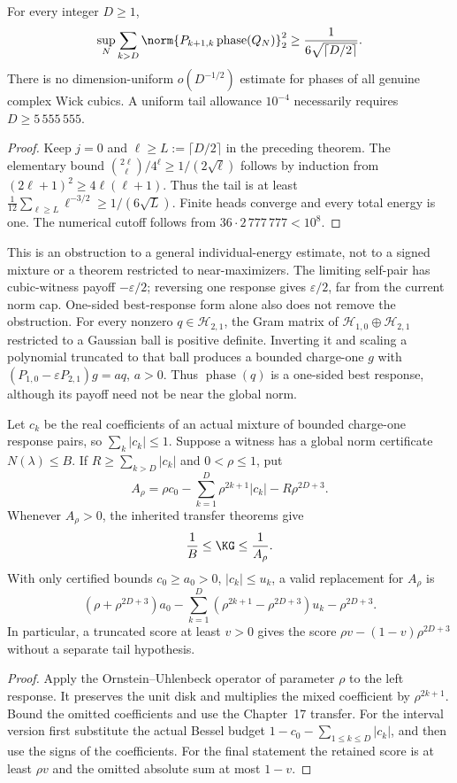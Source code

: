 \begin{corollary}
\label{cor:joint-cubic-tail-obstruction}
For every integer $D\ge1$,
\[
 \sup_N\sum_{k>D}\norm{P_{k+1,k}\operatorname{phase}(Q_N)}_2^2
 \ge\frac1{6\sqrt{\lceil D/2\rceil}}.
\]
There is no dimension-uniform $o(D^{-1/2})$ estimate for phases of all
genuine complex Wick cubics. A uniform tail allowance $10^{-4}$
necessarily requires $D\ge5\,555\,555$.
\end{corollary}
\begin{proof}
Keep $j=0$ and $\ell\ge L:=\lceil D/2\rceil$ in the preceding theorem.
The elementary bound $\binom{2\ell}{\ell}/4^\ell\ge1/(2\sqrt\ell)$
follows by induction from $(2\ell+1)^2\ge4\ell(\ell+1)$.
Thus the tail is at least
$\frac1{12}\sum_{\ell\ge L}\ell^{-3/2}\ge1/(6\sqrt L)$.
Finite heads converge and every total energy is one. The numerical
cutoff follows from $36\cdot2\,777\,777<10^8$.
\end{proof}

This is an obstruction to a general individual-energy estimate, not
to a signed mixture or a theorem restricted to near-maximizers. The
limiting self-pair has cubic-witness payoff $-\varepsilon/2$; reversing
one response gives $\varepsilon/2$, far from the current norm cap.
One-sided best-response form alone also does not remove the obstruction.
For every nonzero $q\in\mathcal H_{2,1}$, the Gram matrix of
$\mathcal H_{1,0}\oplus\mathcal H_{2,1}$ restricted to a Gaussian ball
is positive definite. Inverting it and scaling a polynomial truncated
to that ball produces a bounded charge-one $g$ with
$(P_{1,0}-\varepsilon P_{2,1})g=aq$, $a>0$.
Thus $\operatorname{phase}(q)$ is a one-sided best response, although
its payoff need not be near the global norm.

\begin{proposition}
\label{prop:joint-common-certificate}
Let $c_k$ be the real coefficients of an actual mixture of bounded
charge-one response pairs, so $\sum_k|c_k|\le1$. Suppose a witness
has a global norm certificate $N(\lambda)\le B$.
If $R\ge\sum_{k>D}|c_k|$ and $0<\rho\le1$, put
\[
 A_\rho=\rho c_0-\sum_{k=1}^D\rho^{2k+1}|c_k|
                  -R\rho^{2D+3}.
\]
Whenever $A_\rho>0$, the inherited transfer theorems give
\[
 \frac1B\le\KG\le\frac1{A_\rho}.
\]
With only certified bounds $c_0\ge a_0>0$, $|c_k|\le u_k$, a valid
replacement for $A_\rho$ is
\[
 (\rho+\rho^{2D+3})a_0
 -\sum_{k=1}^D(\rho^{2k+1}-\rho^{2D+3})u_k-\rho^{2D+3}.
\]
In particular, a truncated score at least $v>0$ gives the score
$\rho v-(1-v)\rho^{2D+3}$ without a separate tail hypothesis.
\end{proposition}
\begin{proof}
Apply the Ornstein--Uhlenbeck operator of parameter $\rho$ to the left
response. It preserves the unit disk and multiplies the mixed
coefficient by $\rho^{2k+1}$. Bound the omitted coefficients and use
the Chapter~17 transfer. For the interval version first substitute the
actual Bessel budget $1-c_0-\sum_{1\le k\le D}|c_k|$, and then use
the signs of the coefficients. For the final statement the retained
score is at least $\rho v$ and the omitted absolute sum at most $1-v$.
\end{proof}

